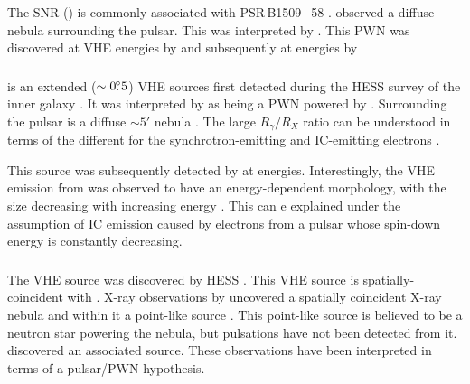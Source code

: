 \subsubsection{\mshfifteenfiftytwo}

The \ac{SNR}  (\mshfifteenfiftytwo)
\cite{caswell_1981a_high-resolution-radio} is commonly
associated with PSR\,B1509$-$58 \cite{seward_1982a_x-ray-pulsar}.
\cite{seward_1982a_x-ray-pulsar} observed a diffuse nebula surrounding the
pulsar. This was interpreted by \cite{trussoni_1996a_rosat-observations}.
This \ac{PWN} was discovered at \ac{VHE} energies by
\cite{aharonian_2005a_discovery-extended} and subsequently at \gev
energies by \cite{abdo_2010a_detection-energetic}

\subsubsection{}

 is an extended ($\sim0\mbox{$.\!\!^\circ$}5$) \ac{VHE} sources
first detected during the \ac{HESS} survey of the inner
galaxy \citep{aharonian_2006a_h.e.s.s.-survey}.  It was
interpreted by \cite{aharonian_2005a_possible-association}
as being a \ac{PWN} powered by  \citep[also known as
,][]{clifton_1992a_high-frequency-survey}.  Surrounding the
pulsar is a diffuse $\sim 5'$ nebula \cite{finley_1996a_morphology-young}.
The large $R_\gamma/R_X$ ratio can be understood in terms of the
different for the synchrotron-emitting and \ac{IC}-emitting electrons
\citep{aharonian_2006a_h.e.s.s.-survey}.

This source was subsequently detected by
\cite{grondin_2011a_detection-pulsar} at \gev energies.  Interestingly,
the \ac{VHE} emission from  was observed to have an
energy-dependent morphology, with the size decreasing with increasing
energy \citep{aharonian_2006a_energy-dependent}.  This can e explained
under the assumption of \ac{IC} emission caused by electrons from a
pulsar whose spin-down energy is constantly decreasing.

\subsubsection{}

The \ac{VHE} source  was discovered by
\ac{HESS} \citep{aharonian_2006a_h.e.s.s.-survey}.  This
\ac{VHE} source is spatially-coincident with 
\citep{shaver_1970a_galactic-radio}.  X-ray observations by
\xmmnewton uncovered a spatially coincident X-ray nebula and within it
a point-like source \cite{funk_2007a_xmm-newton-observations}.
This point-like source is believed to be a neutron star powering the
nebula, but pulsations have not been detected from it.
\cite{slane_2010_fermi-detection} discovered an associated \gev source.
These observations have been interpreted in terms of a pulsar/\ac{PWN}
hypothesis.

